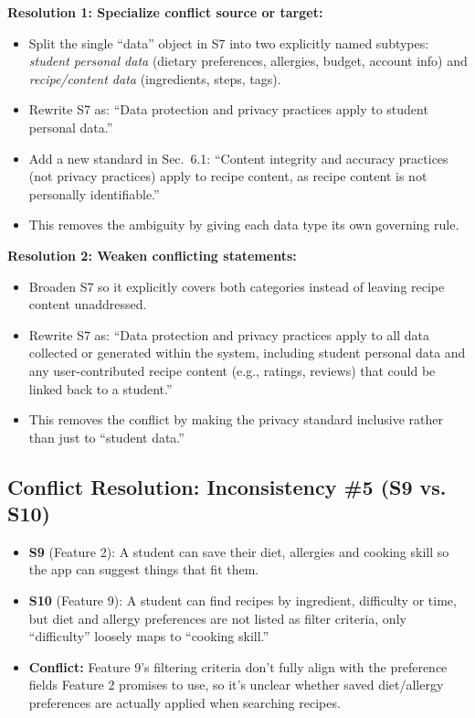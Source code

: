 \documentclass[11pt]{article}
\begin{document}
\textbf{Resolution 1: Specialize conflict source or target:}
\begin{itemize}[leftmargin=1.5em]
  \item Split the single ``data'' object in S7 into two explicitly named subtypes: \textit{student personal data} (dietary preferences, allergies, budget, account info) and \textit{recipe/content data} (ingredients, steps, tags).
  \item Rewrite S7 as: ``Data protection and privacy practices apply to student personal data.''
  \item Add a new standard in Sec.~6.1: ``Content integrity and accuracy practices (not privacy practices) apply to recipe content, as recipe content is not personally identifiable.''
  \item This removes the ambiguity by giving each data type its own governing rule.
\end{itemize}

\textbf{Resolution 2: Weaken conflicting statements:}
\begin{itemize}[leftmargin=1.5em]
  \item Broaden S7 so it explicitly covers both categories instead of leaving recipe content unaddressed.
  \item Rewrite S7 as: ``Data protection and privacy practices apply to all data collected or generated within the system, including student personal data and any user-contributed recipe content (e.g., ratings, reviews) that could be linked back to a student.''
  \item This removes the conflict by making the privacy standard inclusive rather than just to ``student data.''
\end{itemize}

\subsection*{Conflict Resolution: Inconsistency \#5 (S9 vs. S10)}

\begin{itemize}[leftmargin=1.5em]
  \item \textbf{S9} (Feature 2): A student can save their diet, allergies and cooking skill so the app can suggest things that fit them.
  \item \textbf{S10} (Feature 9): A student can find recipes by ingredient, difficulty or time, but diet and allergy preferences are not listed as filter criteria, only ``difficulty'' loosely maps to ``cooking skill.''
  \item \textbf{Conflict:} Feature 9's filtering criteria don't fully align with the preference fields Feature 2 promises to use, so it's unclear whether saved diet/allergy preferences are actually applied when searching recipes.
\end{itemize}
\end{document}
